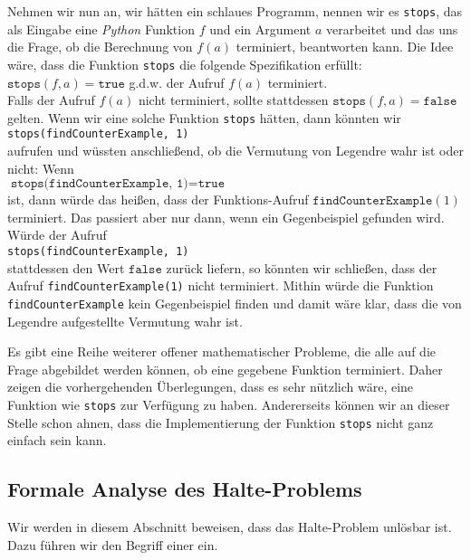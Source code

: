 Nehmen wir nun an, wir hätten ein schlaues Programm, nennen wir es \texttt{stops}, das als Eingabe
eine \textsl{Python} Funktion $f$ und ein Argument $a$ verarbeitet und das uns die Frage, ob die Berechnung von $f(a)$
terminiert, beantworten kann.  Die Idee wäre, dass die Funktion \texttt{stops} die folgende Spezifikation erfüllt:
\\[0.2cm]
\hspace*{1.3cm}
$\texttt{stops}(f, a) = \texttt{true}$ \quad g.d.w. \quad der Aufruf $f(a)$ terminiert.
\\[0.2cm]
Falls der Aufruf $f(a)$ nicht terminiert,  sollte stattdessen $\texttt{stops}(f,a) = \texttt{false}$ gelten.
Wenn wir eine solche Funktion \texttt{stops} hätten, dann könnten wir 
\\[0.2cm]
\hspace*{1.3cm}
\texttt{stops(findCounterExample, 1)}
\\[0.2cm]
aufrufen und wüssten anschließend, ob die Vermutung von Legendre wahr ist oder nicht:  Wenn
\\[0.2cm]
\hspace*{1.3cm}
$\texttt{stops(findCounterExample, 1)} = \texttt{true}$
 \\[0.2cm]
ist, dann würde das heißen,
dass der Funktions-Aufruf $\texttt{findCounterExample}(1)$ terminiert.  Das passiert aber nur dann,
wenn ein Gegenbeispiel gefunden wird.  Würde der Aufruf 
\\[0.2cm]
\hspace*{1.3cm}
\texttt{stops(findCounterExample, 1)}
\\[0.2cm]
stattdessen den Wert  $\texttt{false}$ zurück liefern, so könnten wir schließen, dass der Aufruf \texttt{findCounterExample(1)}
nicht terminiert. Mithin würde die Funktion \texttt{findCounterExample} kein Gegenbeispiel finden und
damit wäre klar, dass die von Legendre aufgestellte Vermutung wahr ist.

Es gibt eine Reihe weiterer offener  mathematischer Probleme, die alle auf die Frage abgebildet
werden können, ob eine gegebene Funktion terminiert.  Daher zeigen die vorhergehenden Überlegungen,
dass es sehr nützlich wäre, eine Funktion wie \texttt{stops} zur Verfügung zu haben.  Andererseits
können wir an dieser Stelle schon ahnen, dass die Implementierung der Funktion \texttt{stops}
nicht ganz einfach sein kann.  

 
\subsection{Formale Analyse des Halte-Problems}
Wir werden in diesem Abschnitt beweisen, dass das Halte-Problem unlösbar ist.  Dazu führen
wir den Begriff einer  ein.  
\pagebreak

